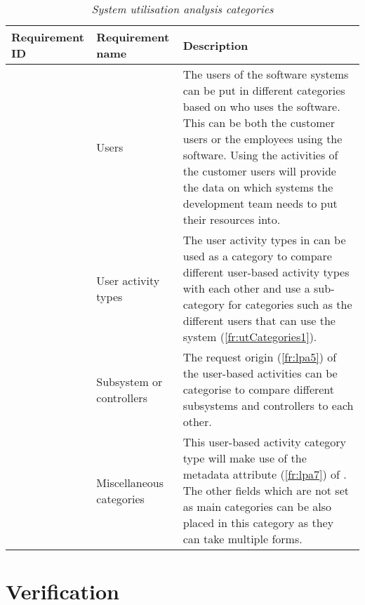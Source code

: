 \begin{table}[!htb]
	\centering
	\caption[System utilisation analysis categories]
	{\textit{System utilisation analysis categories}}
	\label{tbl:ch2_utilisationCategories}
	\begin{tabularx}{\textwidth}{|l|l|X|}
		\hline \textbf{Requirement ID} & \textbf{Requirement name} & \textbf{Description} \\
		\hline \subsubphase{fr:utCategories1} & Users & The users of the software systems can be put in different categories based on who uses the software. This can be both the customer users or the employees using the software. Using the activities of the customer users will provide the data on which systems the development team needs to put their resources into. \\
		\hline \subsubphase{fr:utCategories2} & User activity types & The user activity types in \Cref{tbl:ch2_userActivityTypes} can be used as a category to compare different user-based activity types with each other and use a sub-category for categories such as the different users that can use the system (\ref{fr:utCategories1}). \\
		\hline \subsubphase{fr:utCategories3} & Subsystem or controllers & The request origin (\ref{fr:lpa5}) of the user-based activities can be categorise to compare different subsystems and controllers to each other.\\
		\hline \subsubphase{fr:utCategories3} & Miscellaneous categories & This user-based activity category type will make use of the metadata attribute (\ref{fr:lpa7}) of \Cref{tbl:ch2_keyLoggingAttributes}. The other fields which are not set as main categories can be also placed in this category as they can take multiple forms.\\
		\hline
	\end{tabularx}
\end{table}

\clearpage

\section{Verification}

